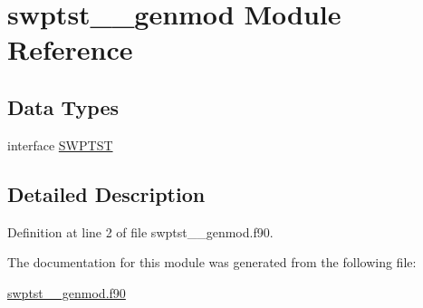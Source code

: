 \hypertarget{classswptst____genmod}{\section{swptst\+\_\+\+\_\+genmod Module Reference}
\label{classswptst____genmod}
}
\subsection*{Data Types}
\begin{DoxyCompactItemize}
\item 
interface \hyperlink{interfaceswptst____genmod_1_1SWPTST}{S\+W\+P\+T\+S\+T}
\end{DoxyCompactItemize}


\subsection{Detailed Description}


Definition at line 2 of file swptst\+\_\+\+\_\+genmod.\+f90.



The documentation for this module was generated from the following file\+:\begin{DoxyCompactItemize}
\item 
\hyperlink{swptst____genmod_8f90}{swptst\+\_\+\+\_\+genmod.\+f90}\end{DoxyCompactItemize}
